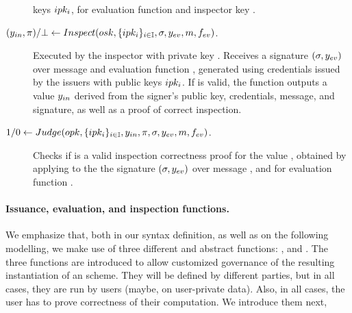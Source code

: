 \begin{description}
  keys $ipk_i$, for evaluation function \feval and inspector key \opk.
\item[$(y_{in},\pi)/\bot \gets Inspect(osk,\lbrace ipk_i
  \rbrace_{i \in \mathbb{I}},\sigma,y_{ev},m,f_{ev})$.] %
  Executed by the inspector with private key \osk. Receives a signature $(\sigma,
  y_{ev})$ over message \msg and evaluation function \feval, generated using
  credentials issued by the issuers with public keys $ipk_i$. If \sig is valid,
  the function outputs a value $y_{in}$ derived from the signer's public key,
  credentials, message, and signature, as well as a proof of correct
  inspection.
\item[$1/0 \gets Judge(opk,\lbrace ipk_i \rbrace_{i \in \mathbb{I}},y_{in},
  \pi,\sigma,y_{ev},m,f_{ev})$.] %
  Checks if \iproof is a valid inspection correctness proof for the value \yinsp,
  obtained by applying \Inspect to the the signature $(\sigma,y_{ev})$ over
  message \msg, and for evaluation function \feval. 
\end{description}

\paragraph{Issuance, evaluation, and inspection functions.} %
We emphasize that, both in our syntax definition, as well as on the following
modelling, we make use of three different and abstract functions: \fissue,
\feval and \finsp. The three functions are introduced to allow customized
governance of the resulting instantiation of an \UAS scheme. They will be
defined by different parties, but in all cases, they are run by users (maybe,
on user-private data). Also, in all cases, the user has to prove correctness of
their computation. We introduce them next, 

